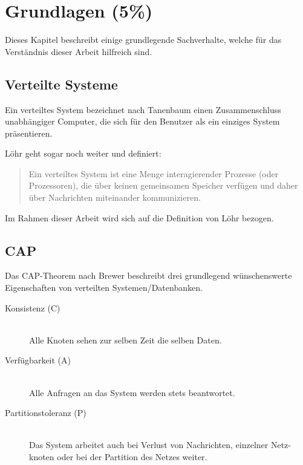\chapter{Grundlagen (5\%)}
\label{chap:base}
Dieses Kapitel beschreibt einige grundlegende Sachverhalte,
welche für das Verständnis dieser Arbeit hilfreich sind.

\section{Verteilte Systeme}
\label{sec:base:vs}

Ein verteiltes System bezeichnet nach Tanenbaum \cite{tanenbaum:vs}
einen Zusammenschluss unabhängiger Computer, die sich für den Benutzer als ein einziges System präsentieren.

L\"ohr geht sogar noch weiter und definiert:
\begin{quotation}
    Ein verteiltes System ist eine Menge
    interagierender Prozesse (oder Prozessoren),
    die über keinen gemeinsamen Speicher verfügen
    und daher über Nachrichten miteinander kommunizieren. \cite{loehr:vs}
\end{quotation}

Im Rahmen dieser Arbeit wird sich auf die Definition von L\"ohr bezogen.

\section{CAP}
\label{sec:base:cap}
Das \ac{CAP}-Theorem nach Brewer \cite{brewer:cap} beschreibt drei grundlegend
wünschenswerte Eigenschaften von verteilten Systemen/Datenbanken.

\begin{description}
  \item[Konsistenz (C)] \hfill \\
      Alle Knoten sehen zur selben Zeit die selben Daten. 
  \item[Verfügbarkeit (A)] \hfill \\
      Alle Anfragen an das System werden stets beantwortet.
  \item[Partitionstoleranz (P)] \hfill \\
      Das System arbeitet auch bei Verlust von Nachrichten,
      einzelner Netz-knoten oder bei der Partition des Netzes weiter.
\end{description}

